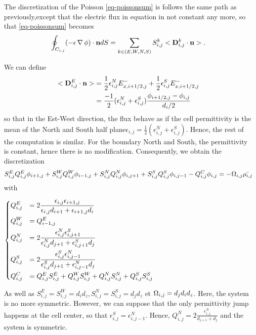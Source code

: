     The discretization of the Poisson \cref{eq-poissonsum} is follows the same path as previously,except that the electric flux in equation in not constant any more, so that \cref{eq-poissonsum} becomes
    \begin{equation}
    \oint_{C_{i,j}} (-\epsilon \operatorname{{\mathbf \nabla}} \phi) \cdot {\mathbf n} dS = \sum_{k\in(E,W,N,S)} S^k_{i,j} <{\mathbf D}^k_{i,j} \cdot {\mathbf n}>.
    \end{equation}

    We can define
    \begin{align}
    <{\mathbf D}^E_{i,j} \cdot {\mathbf n} >&= \frac{1}{2} \epsilon_{i,j}^N E_{x, i+1/2,j}^- + \frac{1}{2} \epsilon_{i,j}^S E_{x, i+1/2,j}^-\\
     &= \frac{-1}{2} (\epsilon_{i,j}^N + \epsilon_{i,j}^S) \frac{\phi_{i+1/2,j} - \phi_{i,j}}{d_i/2}
     \label{eq-flux}
    \end{align}
    so that in the Est-West direction, the flux behave as if the cell permittivity is the mean of the North and South half plane$\epsilon_{i,j} = \frac{1}{2} (\epsilon_{i,j}^N + \epsilon_{i,j}^S)$.
    Hence, the rest of the computation is similar.
    For the boundary North and South, the permittivity is constant, hence there is no modification.
    Consequently, we obtain the discretization
    \begin{equation}
    S^E_{i,j} Q^E_{i,j} \phi_{i+1,j} + S^W_{i,j} Q^W_{i,j} \phi_{i-1,j} + S^N_{i,j} Q^N_{i,j} \phi_{i,j+1} + S^S_{i,j} Q^S_{i,j} \phi_{i,j-1} - Q^C_{i,j} \phi_{i,j} = - \Omega_{i,j} \bar{\rho_{i,j}}
    \label{eq-descretPoissoncentered}
    \end{equation}
    with
    \begin{center}
     $\begin{dcases}
     Q^E_{i,j} &= 2\frac{\epsilon_{i,j} \epsilon_{i+1,j}}{\epsilon_{i,j} d_{i+1} + \epsilon_{i+1,j} d_i} \\
     Q^W_{i,j} &= Q^E_{i-1,j} \\
     Q^N_{i,j} &= 2\frac{\epsilon_{i,j}^N \epsilon_{i,j+1}^S}{\epsilon_{i,j}^N d_{j+1} + \epsilon_{i,j+1}^S d_{j}}\\
     Q^S_{i,j} &= 2\frac{\epsilon_{i,j}^S \epsilon_{i,j-1}^N}{\epsilon_{i,j}^S d_{j+1} + \epsilon_{i,j-1}^N d_{j}} \\
     Q^C_{i,j} &= Q^E_{i,j}S^E_{i,j}+Q^W_{i,j}S^W_{i,j}+Q^N_{i,j}S^N_{i,j}+Q^S_{i,j}S^S_{i,j}
     \end{dcases}$
    \end{center}

    As well as $S^E_{i,j} = S^W_{i,j} =d_id_z, S^N_{i,j} = S^S_{i,j}= d_jd_z$ et $\Omega_{i,j} = d_jd_id_z$.
    Here, the system is no more symmetric.
    However, we can suppose that the only permittivity jump happens at the cell center, so that  $\epsilon_{i,j}^S = \epsilon_{i,j-1}^N$.
    Hence, $Q^N_{i,j} = 2\frac{\epsilon_{i,j}^N}{ d_{j+1} + d_{j}}$ and the system is symmetric.

